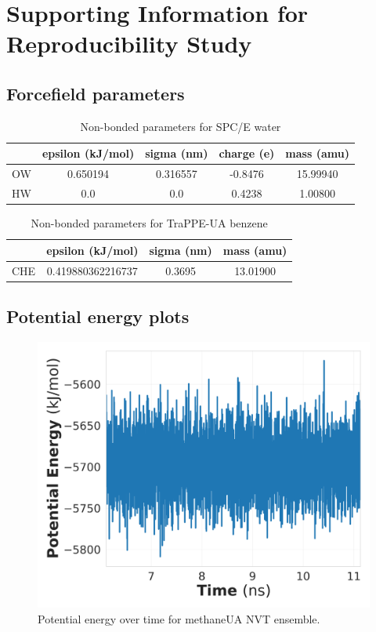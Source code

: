 \chapter{Supporting Information for Reproducibility Study}
\label{chap:rep_SI}

\newpage %

\section{Forcefield parameters}

\begin{table}[h!]
\caption{Non-bonded parameters for SPC/E water} \label{tab:water}
\centering
\begin{tabular}{lcccc}
   & epsilon (kJ/mol) & sigma (nm) & charge (e) & mass (amu) \\ \hline
OW & 0.650194         & 0.316557   & -0.8476    &  15.99940  \\ 
HW & 0.0              & 0.0        &  0.4238    &  1.00800   \\ \hline
\end{tabular}
\end{table}

\begin{table}[h!]
\caption{Non-bonded parameters for TraPPE-UA benzene} \label{tab:bz_nonbond}
\centering
\begin{tabular}{lccc}
    & epsilon (kJ/mol)  & sigma (nm) & mass (amu) \\ \hline
CHE & 0.419880362216737 & 0.3695     &  13.01900  \\ \hline
\end{tabular}
\end{table}

\section{Potential energy plots}

\begin{figure}[h!]
    \centering
    \includegraphics[width=0.8\linewidth,keepaspectratio]{figures/rep_study/methane_pe.png}
    \caption{Potential energy over time for methaneUA NVT ensemble.}\label{fig:methane_pe_evolution}
\end{figure}

